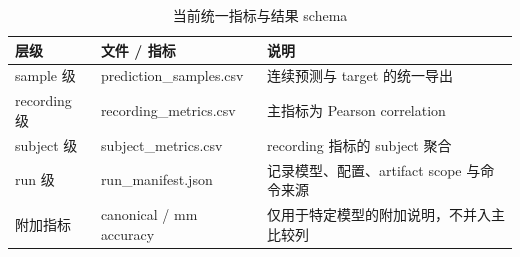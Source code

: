 \begin{table}[ht]
\centering
\caption{当前统一指标与结果 schema}
\begin{tabular}{lll}
\toprule
层级 & 文件 / 指标 & 说明 \\
\midrule
sample 级 & prediction\_samples.csv & 连续预测与 target 的统一导出 \\
recording 级 & recording\_metrics.csv & 主指标为 Pearson correlation \\
subject 级 & subject\_metrics.csv & recording 指标的 subject 聚合 \\
run 级 & run\_manifest.json & 记录模型、配置、artifact scope 与命令来源 \\
附加指标 & canonical / mm accuracy & 仅用于特定模型的附加说明，不并入主比较列 \\
\bottomrule
\end{tabular}
\end{table}
